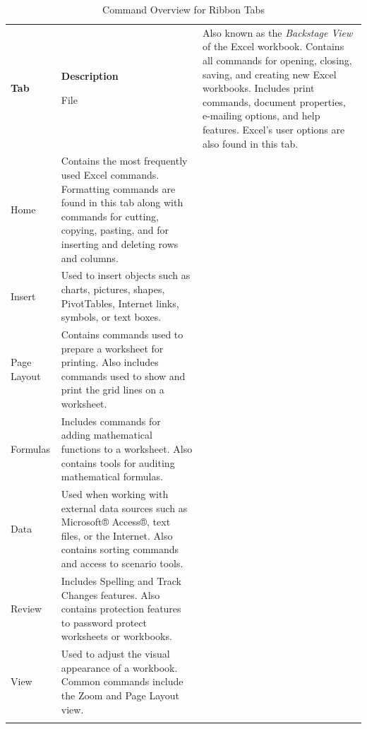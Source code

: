 \begin{table}[H]
	{\small
		\begin{longtable}{L{0.75in}L{3.50in}} %
			\textbf{Tab} & \textbf{Description} \endhead
			\hline

			File & Also known as the \textit{Backstage View} of the Excel workbook. Contains all commands for opening, closing, saving, and creating new Excel workbooks. Includes print commands, document properties, e-mailing options, and help features. Excel's user options are also found in this tab.\\

			Home & Contains the most frequently used Excel commands. Formatting commands are found in this tab along with commands for cutting, copying, pasting, and for inserting and deleting rows and columns.\\
			
			Insert & Used to insert objects such as charts, pictures, shapes, PivotTables, Internet links, symbols, or text boxes.\\
			
			Page Layout & Contains commands used to prepare a worksheet for printing. Also includes commands used to show and print the grid lines on a worksheet.\\
			
			Formulas & Includes commands for adding mathematical functions to a worksheet. Also contains tools for auditing mathematical formulas.\\
			
			Data & Used when working with external data sources such as Microsoft® Access®, text files, or the Internet. Also contains sorting commands and access to scenario tools.\\
			
			Review & Includes Spelling and Track Changes features. Also contains protection features to password protect worksheets or workbooks.\\
			
			View & Used to adjust the visual appearance of a workbook. Common commands include the Zoom and Page Layout view.\\

			\caption{Command Overview for Ribbon Tabs}
			\label{01:tab01}
		\end{longtable}
	} %
\end{table}

